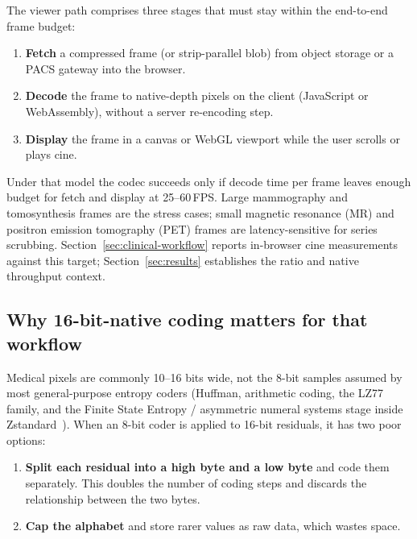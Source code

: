 \documentclass[journal]{IEEEtran}
\begin{document}
The viewer path comprises three stages that must stay within the end-to-end
frame budget:

\begin{enumerate}
  \item \textbf{Fetch} a compressed frame (or strip-parallel blob) from object
  storage or a PACS gateway into the browser.
  \item \textbf{Decode} the frame to native-depth pixels on the client
  (JavaScript or WebAssembly), without a server re-encoding step.
  \item \textbf{Display} the frame in a canvas or WebGL viewport while the user
  scrolls or plays cine.
\end{enumerate}

Under that model the codec succeeds only if decode time per frame leaves enough
budget for fetch and display at 25--60\,FPS. Large mammography and
tomosynthesis frames are the stress cases; small magnetic resonance (MR) and
positron emission tomography (PET) frames are latency-sensitive for series
scrubbing. Section~\ref{sec:clinical-workflow} reports in-browser cine
measurements against this target; Section~\ref{sec:results} establishes the
ratio and native throughput context.

\subsection{Why 16-bit-native coding matters for that workflow}

Medical pixels are commonly 10--16 bits wide, not the 8-bit samples assumed by
most general-purpose entropy coders (Huffman, arithmetic coding, the LZ77
family, and the Finite State Entropy / asymmetric numeral systems stage inside
Zstandard~\cite{rfc8878}). When an 8-bit coder is applied to 16-bit residuals,
it has two poor options:

\begin{enumerate}
  \item \textbf{Split each residual into a high byte and a low byte} and code
  them separately. This doubles the number of coding steps and discards the
  relationship between the two bytes.
  \item \textbf{Cap the alphabet} and store rarer values as raw data, which
  wastes space.
\end{enumerate}
\end{document}
